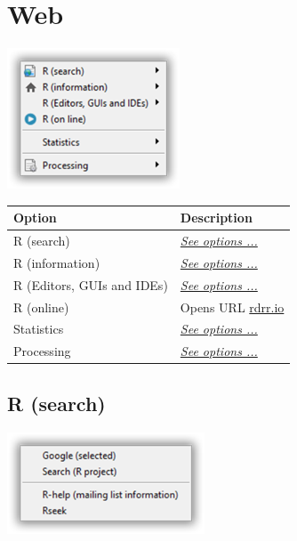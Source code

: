 
\hypertarget{menu_web}{}
\section{Web}

\includegraphics[scale=0.50]{./res/menu_web.png}\\

\begin{scriptsize}
  \begin{tabularx}{\textwidth}{>{\hsize=0.3\hsize}X>{\hsize=0.7\hsize}X}\\
    \hline
    \textbf{Option} & \textbf{Description} \\
    \hline
    R (search) & \textit{\href{\#menu\_web\_rsearch}{See options ...}} \\
    R (information) & \textit{\href{\#menu\_web\_rinformation}{See options ...}} \\
    R (Editors, GUIs and IDEs) & \textit{\href{\#menu\_web\_rguis}{See options ...}} \\
    R (online) & Opens URL \href{https://rdrr.io/snippets/}{rdrr.io} \\
    Statistics & \textit{\href{\#menu\_web\_statistics}{See options ...}} \\
    Processing & \textit{\href{\#menu\_web\_processing}{See options ...}} \\
    \hline
  \end{tabularx}
\end{scriptsize}


\hypertarget{menu_web_rsearch}{}
\subsection{R (search)}

\includegraphics[scale=0.50]{./res/menu_web_rsearch.png}\\

